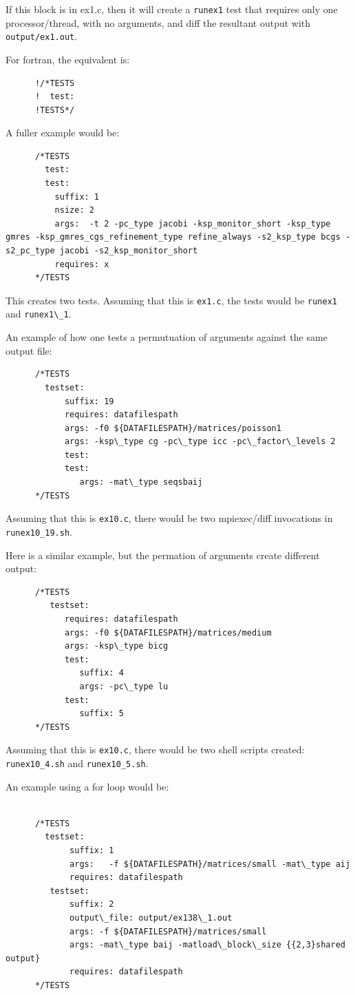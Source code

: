 If this block is in ex1.c, then it will create a \lstinline{runex1} test that
requires only one processor/thread, with no arguments, and diff the
resultant output with \lstinline{output/ex1.out}.

For fortran, the equivalent is:
%
\begin{lstlisting}
      !/*TESTS
      !  test: 
      !TESTS*/
\end{lstlisting}

A fuller example would be:
%
\begin{lstlisting}
      /*TESTS
        test: 
        test:
          suffix: 1
          nsize: 2
          args:  -t 2 -pc_type jacobi -ksp_monitor_short -ksp_type gmres -ksp_gmres_cgs_refinement_type refine_always -s2_ksp_type bcgs -s2_pc_type jacobi -s2_ksp_monitor_short
          requires: x
      */TESTS
\end{lstlisting}

This creates two tests.  Assuming that this is \lstinline{ex1.c}, the tests would
be \lstinline{runex1} and \lstinline{runex1\_1}.


An example of how one tests a permutuation of arguments against the same
output file:
%
\begin{lstlisting}
      /*TESTS
        testset:
            suffix: 19
            requires: datafilespath
            args: -f0 ${DATAFILESPATH}/matrices/poisson1
            args: -ksp\_type cg -pc\_type icc -pc\_factor\_levels 2
            test:
            test:
               args: -mat\_type seqsbaij 
      */TESTS
\end{lstlisting}

Assuming that this is \lstinline{ex10.c}, there would be two
mpiexec/diff invocations in \lstinline{runex10_19.sh}.

Here is a similar example, but the permation of arguments create
different output:

\begin{lstlisting}
      /*TESTS
         testset:
            requires: datafilespath
            args: -f0 ${DATAFILESPATH}/matrices/medium
            args: -ksp\_type bicg
            test:
               suffix: 4
               args: -pc\_type lu
            test:
               suffix: 5 
      */TESTS
\end{lstlisting}
Assuming that this is \lstinline{ex10.c}, there would be two shell
scripts created: \lstinline{runex10_4.sh} and \lstinline{runex10_5.sh}.

An example using a for loop would be:
%
\begin{lstlisting}

      /*TESTS
        testset:
             suffix: 1
             args:   -f ${DATAFILESPATH}/matrices/small -mat\_type aij
             requires: datafilespath
         testset:
             suffix: 2
             output\_file: output/ex138\_1.out
             args: -f ${DATAFILESPATH}/matrices/small
             args: -mat\_type baij -matload\_block\_size {{2,3}shared output}
             requires: datafilespath
      */TESTS

\end{lstlisting}

